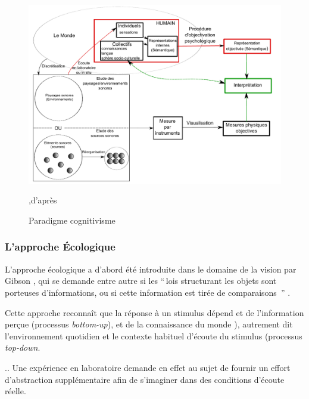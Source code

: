 \begin{figure}[bth]
        \myfloatalign
        \includegraphics[width=\linewidth]{gfx/Shema_maffiolo}
        \caption[Paradigme du cognitivisme]{Paradigme cognitivisme},d'après \citep{maffiolo_caracterisation_1999}\label{fig:paradigme Cognitivisme}
\end{figure}

\subsubsection{L'approche Écologique}
\label{sec:ecologique}

L'approche écologique a d'abord été introduite dans le domaine de la vision par Gibson \citep{gibson1966senses}, qui se demande entre autre si les ``\,lois structurant les objets sont porteuses d'informations, ou si cette information est tirée de comparaisons \,'' \citep{gibson1978ecological}.

Cette approche reconnaît que la réponse à un stimulus dépend et de l'information perçue (processus \emph{bottom-up}), et de la connaissance du monde ), autrement dit l'environnement quotidien et le contexte habituel d'écoute du stimulus (processus \emph{top-down}.

.. Une expérience en laboratoire demande en effet au sujet de fournir un effort d'abstraction supplémentaire afin de s’imaginer dans des conditions d'écoute réelle.

